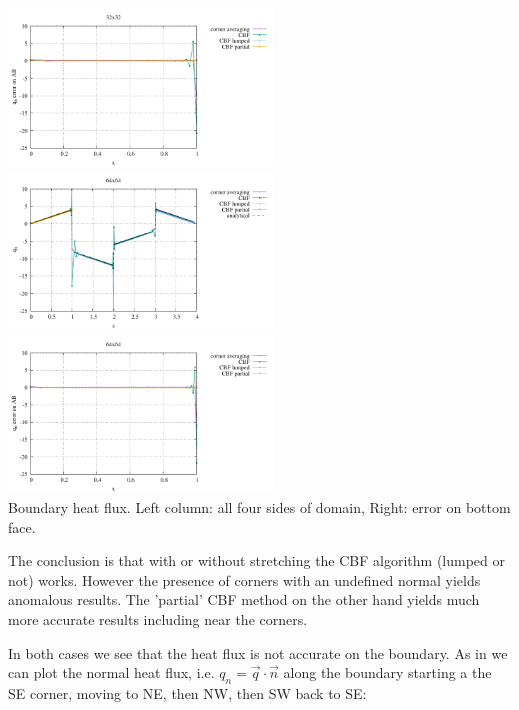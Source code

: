 \begin{center}
\includegraphics[width=7cm]{python_codes/fieldstone_173/results/exp1/heat_flux_boundary_bottom_32.pdf}\\
\includegraphics[width=7cm]{python_codes/fieldstone_173/results/exp1/heat_flux_boundary_64.pdf}
\includegraphics[width=7cm]{python_codes/fieldstone_173/results/exp1/heat_flux_boundary_bottom_64.pdf}\\
{\captionfont Boundary heat flux. Left column: all four sides of domain, Right: error on bottom face.}
\end{center}


The conclusion is that with or without stretching the CBF algorithm (lumped or not) works. 
However the presence of corners with an undefined normal yields anomalous results.
The 'partial' CBF method on the other hand yields much more accurate results including near the corners. 

In both cases we see that the heat flux is not accurate on the boundary.
As in \textcite{grls87} we can plot the normal heat flux, i.e. $q_n=\vec{q}\cdot \vec{n}$
along the boundary starting a the SE corner, moving to NE, then NW, then SW back to SE:


